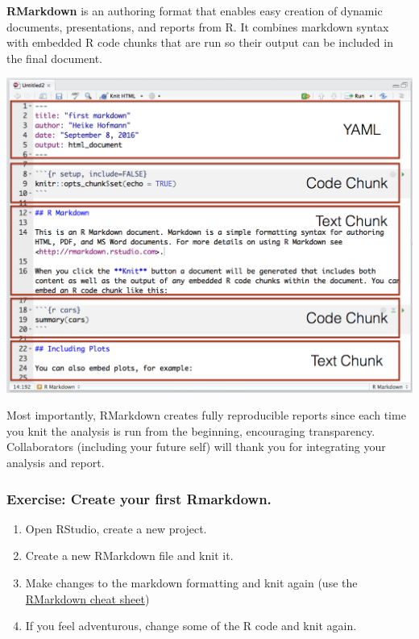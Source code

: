 \documentclass[
]{book}
\providecommand{\tightlist}{%
  \setlength{\itemsep}{0pt}\setlength{\parskip}{0pt}}
\begin{document}
\textbf{RMarkdown} is an authoring format that enables easy creation of dynamic documents, presentations, and reports from R. It combines markdown syntax with embedded R code chunks that are run so their output can be included in the final document.

\includegraphics[width=19.36in]{img/rmarkdown}

Most importantly, RMarkdown creates fully reproducible reports since each time you knit the analysis is run from the beginning, encouraging transparency. Collaborators (including your future self) will thank you for integrating your analysis and report.

\hypertarget{exercise-create-your-first-rmarkdown.}{%
\subsubsection*{Exercise: Create your first Rmarkdown.}\label{exercise-create-your-first-rmarkdown.}}

\begin{enumerate}
\def\labelenumi{\arabic{enumi}.}
\tightlist
\item
  Open RStudio, create a new project.
\item
  Create a new RMarkdown file and knit it.
\item
  Make changes to the markdown formatting and knit again (use the \href{https://www.rstudio.com/resources/cheatsheets/}{RMarkdown cheat sheet})
\item
  If you feel adventurous, change some of the R code and knit again.
\end{enumerate}
\end{document}

